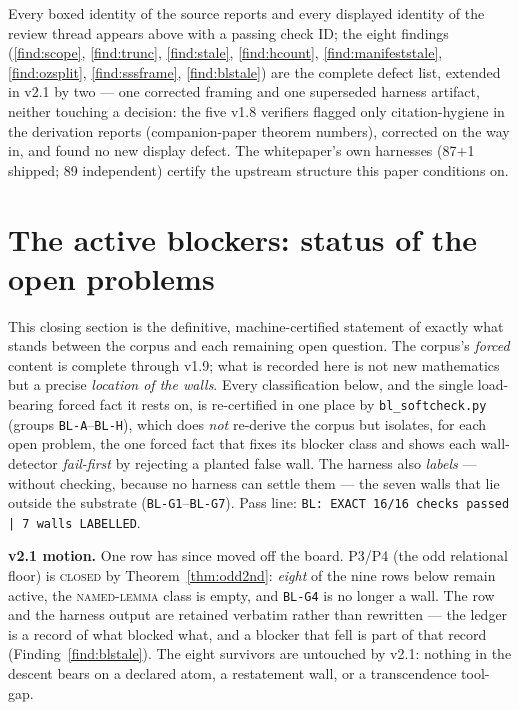 \documentclass[11pt]{article}
\newcommand{\hx}[1]{\textcolor{cC}{\footnotesize\texttt{#1}}}
\theoremstyle{plain}
\theoremstyle{definition}
\theoremstyle{remark}
\begin{document}
\smallskip\noindent
Every boxed identity of the source reports and every displayed identity of the
review thread appears above with a passing check ID; the eight findings
(\ref{find:scope}, \ref{find:trunc}, \ref{find:stale}, \ref{find:hcount},
\ref{find:manifeststale}, \ref{find:ozsplit}, \ref{find:sssframe},
\ref{find:blstale})
are the complete defect list, extended in v2.1 by two --- one corrected framing
and one superseded harness artifact, neither touching a decision: the five v1.8 verifiers
flagged only citation-hygiene in the derivation reports (companion-paper
theorem numbers), corrected on the way in, and found no new display defect. The
whitepaper's own harnesses (87$+$1 shipped; 89 independent) certify the upstream
structure this paper conditions on.

\section{The active blockers: status of the open problems}\label{sec:blockers}

This closing section is the definitive, machine-certified statement of exactly
what stands between the corpus and each remaining open question. The corpus's
\emph{forced} content is complete through v1.9; what is recorded here is not new
mathematics but a precise \emph{location of the walls}. Every classification
below, and the single load-bearing forced fact it rests on, is re-certified in
one place by \texttt{bl\_softcheck.py} (groups \hx{BL-A}--\hx{BL-H}), which does
\emph{not} re-derive the corpus but isolates, for each open problem, the one
forced fact that fixes its blocker class and shows each wall-detector
\emph{fail-first} by rejecting a planted false wall. The harness also
\emph{labels} --- without checking, because no harness can settle them --- the
seven walls that lie outside the substrate (\hx{BL-G1}--\hx{BL-G7}). Pass line:
\texttt{BL: EXACT 16/16 checks passed | 7 walls LABELLED}.

\smallskip\noindent
\textbf{v2.1 motion.} One row has since moved off the board. P3/P4 (the odd
relational floor) is \textsc{closed} by Theorem~\ref{thm:odd2nd}: \emph{eight}
of the nine rows below remain active, the \textsc{named-lemma} class is empty,
and \hx{BL-G4} is no longer a wall. The row and the harness output are retained
verbatim rather than rewritten --- the ledger is a record of what blocked what,
and a blocker that fell is part of that record (Finding~\ref{find:blstale}).
The eight survivors are untouched by v2.1: nothing in the descent bears on a
declared atom, a restatement wall, or a transcendence tool-gap.
\end{document}
